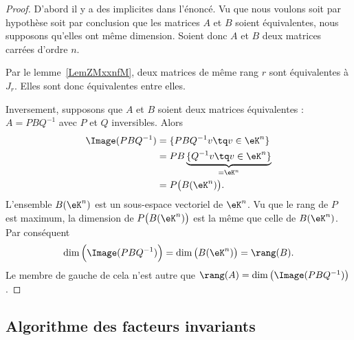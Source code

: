 \begin{proof}
    D'abord il y a des implicites dans l'énoncé. Vu que nous voulons soit par hypothèse soit par conclusion que les matrices \( A\) et \( B\) soient équivalentes, nous supposons qu'elles ont même dimension. Soient donc \( A\) et \( B\) deux matrices carrées d'ordre \( n \).

    Par le lemme~\ref{LemZMxxnfM}, deux matrices de même rang \( r\) sont équivalentes à \( J_r\). Elles sont donc équivalentes entre elles.

    Inversement, supposons que \( A\) et \( B\) soient deux matrices équivalentes : \( A=PBQ^{-1}\) avec \( P\) et \( Q\) inversibles. Alors
    \begin{subequations}
        \begin{align}
            \Image(PBQ^{-1})&=\{ PBQ^{-1}v\tq v\in \eK^n \}\\
            &=PB\underbrace{\{ Q^{-1}v\tq v\in \eK^n \}}_{=\eK^n}\\
            &=P\big( B(\eK^n) \big).
        \end{align}
    \end{subequations}
    L'ensemble \( B(\eK^n)\) est un sous-espace vectoriel de \( \eK^n\). Vu que le rang de \( P\) est maximum, la dimension de \( P\big( B(\eK^n) \big)\) est la même que celle de \( B(\eK^n)\). Par conséquent
    \begin{equation}
        \dim\Big( \Image(PBQ^{-1}) \Big)=\dim\big( B(\eK^n) \big)=\rang(B).
    \end{equation}
    Le membre de gauche de cela n'est autre que \( \rang(A)=\dim\big( \Image(PBQ^{-1}) \big)\).
\end{proof}

\subsection{Algorithme des facteurs invariants}

